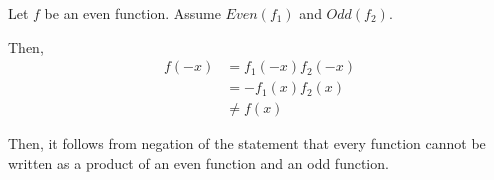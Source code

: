 \documentclass[12pt]{article}
\begin{document}
\begin{enumerate}[a.]
    \bigskip

    Let $f$ be an even function. Assume $Even(f_1)$ and $Odd(f_2)$.

    \bigskip

    Then,
    \setcounter{equation}{0}
    \begin{align}
        f(-x) &= f_1(-x)f_2(-x)\\
        &= -f_1(x)f_2(x)\\
        &\neq f(x)
    \end{align}

    Then, it follows from negation of the statement that every function cannot be
    written as a product of an even function and an odd function.


\end{enumerate}
\end{document}
